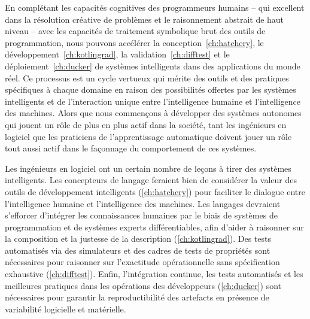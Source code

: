 En complétant les capacités cognitives des programmeurs humains -- qui excellent dans la résolution créative de problèmes et le raisonnement abstrait de haut niveau -- avec les capacités de traitement symbolique brut des outils de programmation, nous pouvons accélérer la conception~\autoref{ch:hatchery}, le développement~\autoref{ch:kotlingrad}, la validation~\autoref{ch:difftest} et le déploiement~\autoref{ch:ducker} de systèmes intelligents dans des applications du monde réel. Ce processus est un cycle vertueux qui mérite des outils et des pratiques spécifiques à chaque domaine en raison des possibilités offertes par les systèmes intelligents et de l'interaction unique entre l'intelligence humaine et l'intelligence des machines. Alors que nous commençons à développer des systèmes autonomes qui jouent un rôle de plus en plus actif dans la société, tant les ingénieurs en logiciel que les praticiens de l'apprentissage automatique doivent jouer un rôle tout aussi actif dans le façonnage du comportement de ces systèmes.

Les ingénieurs en logiciel ont un certain nombre de leçons à tirer des systèmes intelligents. Les concepteurs de langage feraient bien de considérer la valeur des outils de développement intelligents (\autoref{ch:hatchery}) pour faciliter le dialogue entre l'intelligence humaine et l'intelligence des machines. Les langages devraient s'efforcer d'intégrer les connaissances humaines par le biais de systèmes de programmation et de systèmes experts différentiables, afin d'aider à raisonner sur la composition et la justesse de la description (\autoref{ch:kotlingrad}). Des tests automatisés via des simulateurs et des cadres de tests de propriétés sont nécessaires pour raisonner sur l'exactitude opérationnelle sans spécification exhaustive (\autoref{ch:difftest}). Enfin, l'intégration continue, les tests automatisés et les meilleures pratiques dans les opérations des développeurs (\autoref{ch:ducker}) sont nécessaires pour garantir la reproductibilité des artefacts en présence de variabilité logicielle et matérielle.

